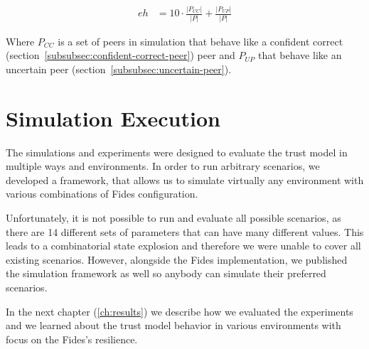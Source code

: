 \begin{equation}
    \begin{split}
    eh &= 10 \cdot \frac{|P_{CC}|}{|P|} + \frac{|P_{UP}|}{|P|}
    \end{split}
    \label{eq:environment_hardness}
\end{equation}

\noindent
Where $P_{CC}$ is a set of peers in simulation that behave like a confident correct (section~\ref{subsubsec:confident-correct-peer}) peer and $P_{UP}$ that behave like an uncertain peer (section~\ref{subsubsec:uncertain-peer}).

\section{Simulation Execution}
\label{sec:simulations-execution}
The simulations and experiments were designed to evaluate the trust model in multiple ways and environments.
In order to run arbitrary scenarios, we developed a framework, that allows us to simulate virtually any environment with various combinations of Fides configuration.

Unfortunately, it is not possible to run and evaluate all possible scenarios, as there are 14 different sets of parameters that can have many different values.
This leads to a combinatorial state explosion and therefore we were unable to cover all existing scenarios. 
However, alongside the Fides implementation, we published the simulation framework as well so anybody can simulate their preferred scenarios.

In the next chapter (\ref{ch:results}) we describe how we evaluated the experiments and we learned about the trust model behavior in various environments with focus on the Fides's resilience.